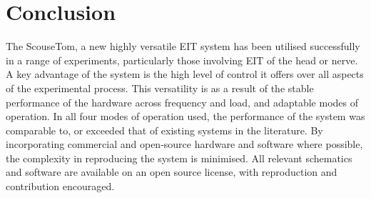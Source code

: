 \section{Conclusion}
The ScouseTom, a new highly versatile EIT system has been utilised successfully in a range of experiments, particularly those involving EIT of the head or nerve. A key advantage of the system is the high level of control it offers over all aspects of the experimental process. This versatility is as a result of the stable performance of the hardware across frequency and load, and adaptable modes of operation. In all four modes of operation used, the performance of the system was comparable to, or exceeded that of existing systems in the literature. By incorporating commercial and open-source hardware and software where possible, the complexity in reproducing the system is minimised. All relevant schematics and software are available on an open source license, with reproduction and contribution encouraged. 
